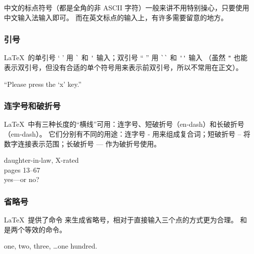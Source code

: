 {中文的标点符号（都是全角的非 ASCII 字符）一般来讲不用特别操心，只要使用中文输入法输入即可。
而在英文标点的输入上，有许多需要留意的地方。

\subsubsection{引号}

\LaTeX\ 的单引号 ` ' 用 \texttt` 和 \texttt' 输入；双引号 `` '' 用 \verb|``| 和 \verb|''| 输入
（虽然 \texttt" 也能表示双引号，但没有合适的单个符号用来表示前双引号，所以不常用在正文）。
\begin{example}
``Please press the `x' key.''
\end{example}

\subsubsection{连字号和破折号}

\LaTeX\ 中有三种长度的“横线”可用：连字号、短破折号（en-dash）和长破折号（em-dash）。
它们分别有不同的用途：连字号 - 用来组成复合词；短破折号 -- 将数字连接表示范围；长破折号 --- 作为破折号使用。
\begin{example}
daughter-in-law, X-rated\\
pages 13--67\\
yes---or no?
\end{example}

\subsubsection{省略号}

\LaTeX\ 提供了命令  来生成省略号，相对于直接输入三个点的方式更为合理。
 和  是两个等效的命令。
\begin{example}
one, two, three, \ldots one hundred.
\end{example}

}
